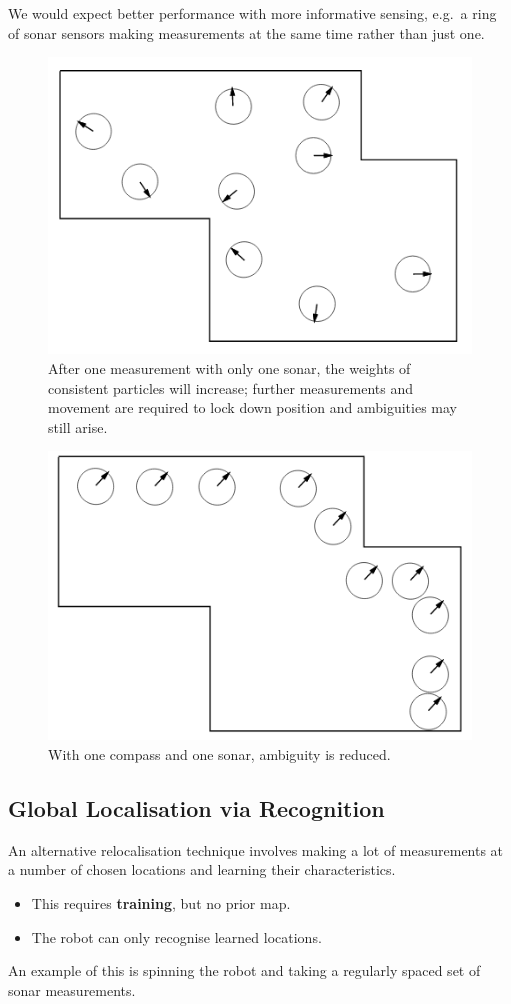 \documentclass[11pt]{article}
\begin{document}
We would expect better performance with more informative sensing, e.g.\ a ring of sonar sensors making measurements at the same time rather than just one.

\begin{figure}[h]
  \caption{After one measurement with only one sonar, the weights of consistent particles will increase; further measurements and movement are required to lock down position and ambiguities may still arise.}
  \includegraphics[scale=0.4]{onesonar}
  \centering
\end{figure}

\begin{figure}[h]
  \caption{With one compass and one sonar, ambiguity is reduced.}
  \includegraphics[scale=0.4]{compasssonar}
  \centering
\end{figure}

\subsection{Global Localisation via Recognition}
An alternative relocalisation technique involves making a lot of measurements at a number of chosen locations and learning their characteristics.
\begin{itemize}
  \item This requires \textbf{training}, but no prior map.
  \item The robot can only recognise learned locations.
\end{itemize}
An example of this is spinning the robot and taking a regularly spaced set of sonar measurements.
\end{document}
